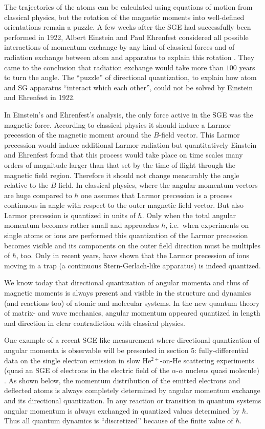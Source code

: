 \documentclass[12pt]{article}
\begin{document}
The trajectories of the atoms can be calculated using equations of motion from classical physics, but the rotation of the magnetic moments into well-defined orientations remain a puzzle. A few weeks after the SGE had successfully been performed in 1922, Albert Einstein and Paul Ehrenfest considered all possible interactions of momentum exchange by any kind of classical forces and of radiation exchange between atom and apparatus to explain this rotation \citep{EinsteinAEtAl1922Bemerkungen,UnnaIEtal2013Einstein}. They came to the conclusion that radiation exchange would take more than $100$ years to turn the angle. The ``puzzle'' of directional quantization, to explain how atom and SG apparatus ``interact which each other'', could not be solved by Einstein and Ehrenfest in 1922. 
 
In Einstein's and Ehrenfest's analysis, the only force active in the SGE was the magnetic force. According to classical physics it should induce a Larmor precession of the magnetic moment around the $B$-field vector. This Larmor precession would induce additional Larmor radiation but quantitatively Einstein and Ehrenfest found that this process would take place on time scales many orders of magnitude larger than that set by the time of flight through the magnetic field region. Therefore it should not change measurably the angle relative to the $B$ field. In classical physics, where the angular momentum vectors are huge compared to $\hbar$ one assumes that Larmor precession is a process continuous in angle with respect to the outer magnetic field vector. But also Larmor precession is quantized in units of $\hbar$. Only when the total angular momentum becomes rather small and approaches $\hbar$, i.e.\ when experiments on single atoms or ions are performed this quantization of the Larmor precession becomes visible and its components on the outer field direction must be multiples of $\hbar$, too. Only in recent years, \cite{HermansphanNEtal2000Observation} have shown that the Larmor precession of ions moving in a trap (a continuous Stern-Gerlach-like apparatus) is indeed quantized.
 
We know today that directional quantization of angular momenta and thus of magnetic moments is always present and visible in the structure and dynamics (and reactions too) of atomic and molecular systems. In the new quantum theory of matrix- and wave mechanics, angular momentum appeared quantized in length and direction in clear contradiction with classical physics.
 
One example of a recent SGE-like measurement where directional quantization of angular momenta is observable will be presented in section 5: fully-differential data on the single electron emission in slow He$^{2+}$-on-He scattering experiments (quasi an SGE of electrons in the electric field of the $\alpha$-$\alpha$ nucleus quasi molecule) \citep{SchmidtLEtal2014Vortices}. As shown below, the momentum distribution of the emitted electrons and deflected atoms is always completely determined by angular momentum exchange and its directional quantization. In any reaction or transition in quantum systems angular momentum is always exchanged in quantized values determined by $\hbar$. Thus all quantum dynamics is ``discretized'' because of the finite value of $\hbar$.   
 
\end{document}
